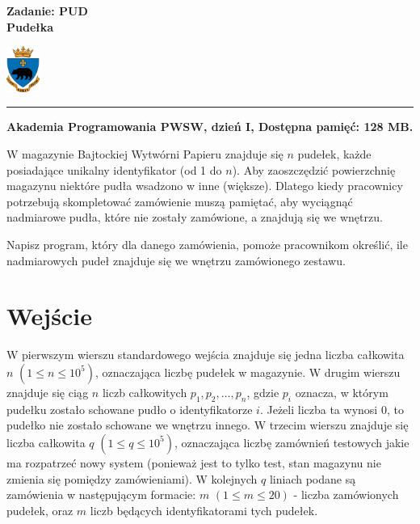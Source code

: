\documentclass[10pt]{article}
\begin{document}
    

    \noindent
    \begin{minipage}{0.5\textwidth}
        \LARGE{\textsf{\textbf{Zadanie: PUD\\Pudełka}}}
    \end{minipage}
    \begin{minipage}{0.5\textwidth}
        \begin{flushright}
            \includegraphics[height=1.5cm]{logo.jpg}
        \end{flushright}
    \end{minipage}
    
    \noindent\rule{\textwidth}{0.4pt}
    
    \noindent\textbf{Akademia Programowania PWSW, dzień I, Dostępna pamięć: 128 MB.}
    \vspace{1em}
    
    
    \noindent
    W magazynie Bajtockiej Wytwórni Papieru znajduje się $n$ pudełek, każde posiadające unikalny identyfikator (od 1 do $n$). Aby zaoszczędzić powierzchnię magazynu niektóre pudła wsadzono w inne (większe). Dlatego kiedy pracownicy potrzebują skompletować zamówienie muszą pamiętać, aby wyciągnąć nadmiarowe pudła, które nie zostały zamówione, a znajdują się we wnętrzu.

    Napisz program, który dla danego zamówienia, pomoże pracownikom określić, ile nadmiarowych pudeł znajduje się we wnętrzu zamówionego zestawu.
    

    \section*{Wejście}
    
    W pierwszym wierszu standardowego wejścia znajduje się jedna liczba całkowita $n$ $(1\leq n\leq 10^{5})$, oznaczająca liczbę pudełek w magazynie. W drugim wierszu znajduje się ciąg $n$ liczb całkowitych $p_{1}, p_{2}, \ldots, p_{n}$, gdzie $p_{i}$ oznacza, w którym pudełku zostało schowane pudło o identyfikatorze $i$. Jeżeli liczba ta wynosi 0, to pudełko nie zostało schowane we wnętrzu innego. W trzecim wierszu znajduje się liczba całkowita $q$ $(1\leq q\leq 10^{5})$, oznaczająca liczbę zamównień testowych jakie ma rozpatrzeć nowy system (ponieważ jest to tylko test, stan magazynu nie zmienia się pomiędzy zamówieniami). W kolejnych $q$ liniach podane są zamówienia w następującym formacie: $m$ $(1 \leq m \leq 20)$ - liczba zamówionych pudełek, oraz $m$ liczb będących identyfikatorami tych pudełek.
\end{document}
